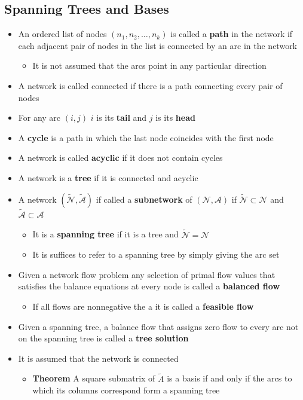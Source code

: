 \documentclass[11pt]{article}
\begin{document}
\subsection{Spanning Trees and Bases}
\label{sec:org128f918}
\begin{itemize}
\item An ordered list of nodes \((n_1,n_2,\dots,n_k)\) is called a \textbf{path} in the network if each adjacent pair of nodes in the list is connected by an arc in the network
\begin{itemize}
\item It is not assumed that the arcs point in any particular direction
\end{itemize}
\item A network is called connected if there is a path connecting every pair of nodes
\item For any arc \((i,j)\) \(i\) is its \textbf{tail} and \(j\) is its \textbf{head}
\item A \textbf{cycle} is a path in which the last node coincides with the first node
\item A network is called \textbf{acyclic} if it does not contain cycles
\item A network is a \textbf{tree} if it is connected and acyclic
\item A network \((\tilde{\mathcal N}, \tilde{\mathcal A})\) if called a \textbf{subnetwork} of \((\mathcal N, \mathcal A)\) if \(\tilde{\mathcal N} \subset \mathcal N\) and \(\tilde{\mathcal A} \subset \mathcal A\)
\begin{itemize}
\item It is a \textbf{spanning tree} if it is a tree and \(\tilde{\mathcal N} = \mathcal N\)
\item It is suffices to refer to a spanning tree by simply giving the arc set
\end{itemize}
\item Given a network flow problem any selection of primal flow values that satisfies the balance equations at every node is called a \textbf{balanced flow}
\begin{itemize}
\item If all flows are nonnegative the a it is called a \textbf{feasible flow}
\end{itemize}
\item Given a spanning tree, a balance flow that assigns zero flow to every arc not on the spanning tree is called a \textbf{tree solution}

\item It is assumed that the network is connected
\begin{itemize}
\item \textbf{Theorem} A square submatrix of \(\tilde{A}\) is a basis if and only if the arcs to which its columns correspond form a spanning tree
\end{itemize}
\end{itemize}
\end{document}
